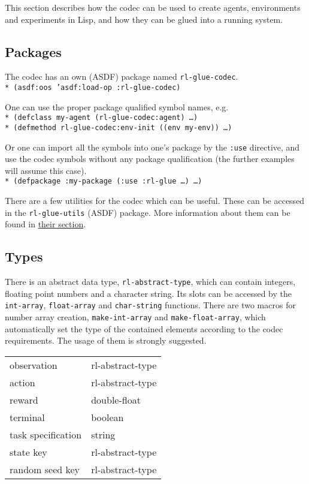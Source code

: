 \documentclass[11pt,a4paper,dvipdfm]{article}
\newcommand{\prompttext}[1]{\texttt{#1}}
\newcommand{\lispprompt}[1]{\prompttext{* #1}}
\begin{document}
This section describes how the codec can be used to create agents, environments
and experiments in Lisp, and how they can be glued into a running system.

\subsection{Packages}

The codec has an own (ASDF) package named \prompttext{rl-glue-codec}. \\
\lispprompt{(asdf:oos 'asdf:load-op :rl-glue-codec)}

One can use the proper package qualified symbol names, e.g. \\
\lispprompt{(defclass my-agent (rl-glue-codec:agent) \ldots)} \\
\lispprompt{(defmethod rl-glue-codec:env-init ((env my-env)) \ldots)}

Or one can import all the symbols into one's package by the \prompttext{:use}
directive, and use the codec symbols without any package qualification
(the further examples will assume this case). \\
\lispprompt{(defpackage :my-package (:use :rl-glue \ldots)~\ldots)}

There are a few utilities for the codec which can be useful. These can be
accessed in the \prompttext{rl-glue-utils} (ASDF) package. More information
about them can be found in \hyperlink{rlutils}{their section}.

\subsection{Types}

There is an abstract data type, \prompttext{rl-abstract-type}, which can
contain integers, floating point numbers and a character string. Its slots can
be accessed by the \prompttext{int-array}, \prompttext{float-array} and
\prompttext{char-string} functions. There are two macros for number array
creation, \prompttext{make-int-array} and \prompttext{make-float-array},
which automatically set the type of the contained elements according to the
codec requirements. The usage of them is strongly suggested.

\begin{center}
\begin{tabular}{ll}
    observation         & rl-abstract-type \\
    action              & rl-abstract-type \\
    reward              & double-float \\
    terminal            & boolean \\
    task specification  & string \\
    state key           & rl-abstract-type \\
    random seed key     & rl-abstract-type \\
\end{tabular}
\end{center}
\end{document}
